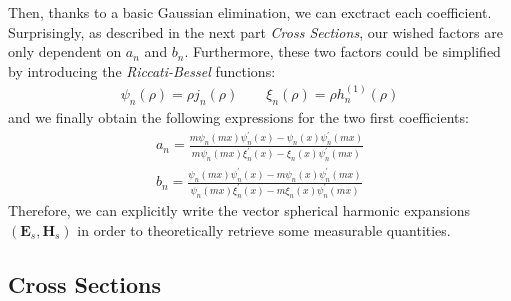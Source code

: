 \documentclass{article}
\numberwithin{equation}{section}
\begin{document}
Then, thanks to a basic Gaussian elimination, we can exctract each coefficient. Surprisingly, as described in the next part \textit{Cross Sections}, our wished factors are only dependent on $a_{n}$ and $b_{n}$. Furthermore, these two factors could be simplified by introducing the \textit{Riccati-Bessel} functions:
\begin{align}
\psi_{n}(\rho)=\rho j_{n}(\rho) \qquad \xi_{n}(\rho)=\rho h^{(1)}_{n}(\rho)
\end{align}
and we finally obtain the following expressions for the two first coefficients:
\begin{equation}\label{eq:an_bn}
\begin{aligned}
a_{n} = \frac{m\psi_{n}(mx)\psi^{'}_{n}(x)-\psi_{n}(x)\psi^{'}_{n}(mx)}{m\psi_{n}(mx)\xi^{'}_{n}(x)-\xi_{n}(x)\psi^{'}_{n}(mx)}\\
b_{n} = \frac{\psi_{n}(mx)\psi^{'}_{n}(x)-m\psi_{n}(x)\psi^{'}_{n}(mx)}{\psi_{n}(mx)\xi^{'}_{n}(x)-m\xi_{n}(x)\psi^{'}_{n}(mx)}
\end{aligned}
\end{equation}
Therefore, we can explicitly write the vector spherical harmonic expansions $(\textbf{E}_{s}, \textbf{H}_{s})$ in order to theoretically retrieve some measurable quantities.

\subsection{Cross Sections}
\end{document}
